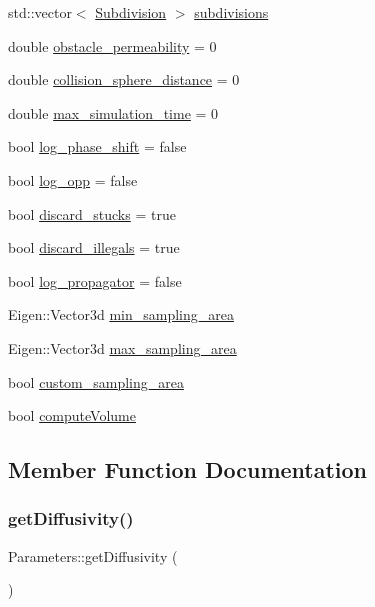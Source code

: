 \begin{DoxyCompactItemize}
\item 
std\+::vector$<$ \hyperlink{class_subdivision}{Subdivision} $>$ \hyperlink{class_parameters_a3c05ff7a30f151c384b83ce3adca26fa}{subdivisions}
\item 
double \hyperlink{class_parameters_a2e5fa275543b4a52599e694e64546e13}{obstacle\+\_\+permeability} = 0
\item 
double \hyperlink{class_parameters_abe008f02a49ef7f7a6f041f79cc81fbb}{collision\+\_\+sphere\+\_\+distance} = 0
\item 
double \hyperlink{class_parameters_a66ad8359ef1cc76e8d5581a402cc86b5}{max\+\_\+simulation\+\_\+time} = 0
\item 
bool \hyperlink{class_parameters_a947e4b1fef66466119ea7b2e8e2bc0e4}{log\+\_\+phase\+\_\+shift} = false
\item 
bool \hyperlink{class_parameters_ae30abbd794dee7f5aaf5d3d51152acef}{log\+\_\+opp} = false
\item 
bool \hyperlink{class_parameters_ab1815ac94d73ca8b56a9f12fca04cb89}{discard\+\_\+stucks} = true
\item 
bool \hyperlink{class_parameters_ac1a5fa4c00eaaf1b40789f329ae20e9a}{discard\+\_\+illegals} = true
\item 
bool \hyperlink{class_parameters_a1f5a62a35d6521994a623d0fd0a98a24}{log\+\_\+propagator} = false
\item 
Eigen\+::\+Vector3d \hyperlink{class_parameters_a8b7e1481e63d5ac9a36eed8ab310d315}{min\+\_\+sampling\+\_\+area}
\item 
Eigen\+::\+Vector3d \hyperlink{class_parameters_a2bf25423e72a562d5812ed0df3e06e2d}{max\+\_\+sampling\+\_\+area}
\item 
bool \hyperlink{class_parameters_af023e7efce57b9da0837731db6a85c87}{custom\+\_\+sampling\+\_\+area}
\item 
bool \hyperlink{class_parameters_a669c92fe7864a00da04bba0c2af93a16}{compute\+Volume}
\end{DoxyCompactItemize}


\subsection{Member Function Documentation}
\mbox{\label{class_parameters_ac429071159941e3957eb7c030280a30f}} 
\subsubsection{\texorpdfstring{get\+Diffusivity()}{getDiffusivity()}}
{\footnotesize\ttfamily Parameters\+::get\+Diffusivity (\begin{DoxyParamCaption}{ }\end{DoxyParamCaption})}

